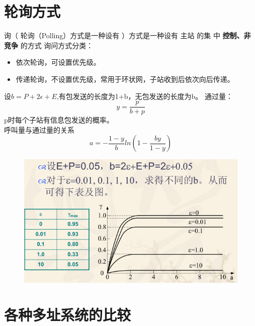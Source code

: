 \section{轮询方式 }
询（ 轮询（Polling）方式是一种设有 ）方式是一种设有 主站 的集
中 \textbf{控制、非竞争} 的方式
询问方式分类：
\begin{itemize}
	\item 依次轮询，可设置优先级。
	\item 传递轮询，不设置优先级，常用于环状网，子站收到后依次向后传递。
\end{itemize}
设$ b = P+2\epsilon + E $,有包发送的长度为1+b，无包发送的长度为b。
通过量：
\begin{equation}\label{key}
y = \frac{p}{b+p}
\end{equation}
p时每个子站有信息包发送的概率。\\
呼叫量与通过量的关系
\begin{equation}\label{key}
a = -\frac{1-y}{b}ln(1-\frac{by}{1-y})
\end{equation}
\begin{figure}[H]
	\centering
	\includegraphics[width=0.7\linewidth]{figures/screenshot015}
	\caption{}
	\label{fig:screenshot015}
\end{figure}
\section{各种多址系统的比较}
